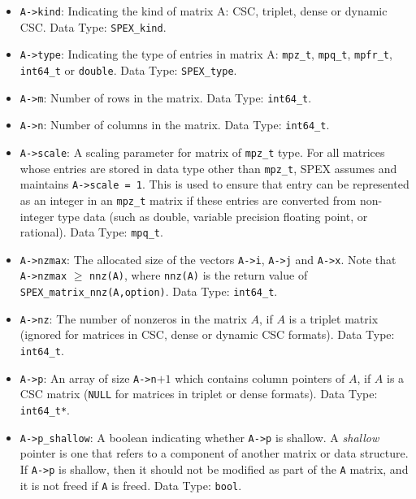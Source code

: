 \documentclass[12pt]{report}
\theoremstyle{definition}
\begin{document}
\begin{itemize}
\item \verb|A->kind|: Indicating the kind of matrix A: CSC, triplet, dense or dynamic CSC.
Data Type: \verb|SPEX_kind|.

\item \verb|A->type|: Indicating the type of entries in matrix A: \verb|mpz_t|,
\verb|mpq_t|, \verb|mpfr_t|, \verb|int64_t| or \verb|double|.
Data Type: \verb|SPEX_type|.

\item \verb|A->m|: Number of rows in the matrix. Data Type: \verb|int64_t|.

\item \verb|A->n|: Number of columns in the matrix. Data Type: \verb|int64_t|.

\item \verb|A->scale|: A scaling parameter for matrix of \verb|mpz_t| type. For
all matrices whose entries are stored in data type other than \verb|mpz_t|, SPEX assumes and maintains
\verb|A->scale = 1|. This is used to ensure that entry can be represented as an
integer in an \verb|mpz_t| matrix if these entries are converted from non-integer type
data (such as double, variable precision floating point, or rational). Data
Type: \verb|mpq_t|.

\item \verb|A->nzmax|: The allocated size of the vectors \verb|A->i|,
\verb|A->j| and \verb|A->x|. Note that \verb|A->nzmax| $\geq$ \verb|nnz(A)|,
where \verb|nnz(A)| is the return value of \verb|SPEX_matrix_nnz(A,option)|.
Data Type: \verb|int64_t|.

\item \verb|A->nz|: The number of nonzeros in the matrix $A$, if $A$ is
a triplet matrix (ignored for matrices in CSC, dense or dynamic CSC formats). Data Type:
\verb|int64_t|.

\item \verb|A->p|: An array of size \verb|A->n|$+1$ which contains column pointers
of $A$, if $A$ is a CSC matrix (\verb|NULL| for matrices in triplet or dense
formats). Data Type: \verb|int64_t*|.

\item \verb|A->p_shallow|: A boolean indicating whether \verb|A->p| is shallow.
A {\em shallow} pointer is one that refers to a component of another matrix or
data structure.  If \verb|A->p| is shallow, then it should not be modified
as part of the \verb|A| matrix, and it is not freed if \verb|A| is freed.
Data Type: \verb|bool|.


\end{itemize}
\end{document}
